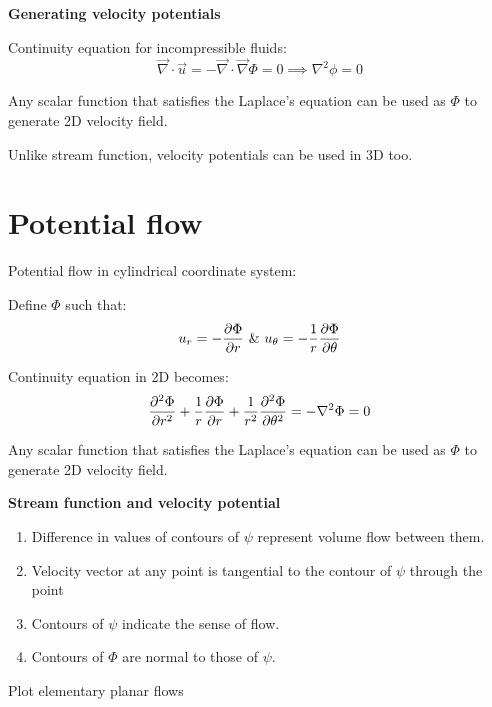 
{\bf Generating velocity potentials}

Continuity equation for incompressible fluids:
$$ \vec{\nabla} \cdot \vec{u} = - \vec{\nabla} \cdot \vec{\nabla}\Phi = 0 \implies  \nabla^2 \phi = 0 $$

Any scalar function that satisfies the Laplace's equation can be used as $\Phi$ to generate 2D velocity field.

Unlike stream function, velocity potentials can be used in 3D too.



\section{Potential flow}

Potential flow in cylindrical coordinate system:

Define $\Phi$ such that:
$$ u_r = -{\partial \Phi \over \partial r} \, \, \& \, \, u_\theta = -{1 \over r}{\partial \Phi \over \partial \theta} $$

Continuity equation in 2D becomes:
$$ {\partial^2 \Phi \over \partial r^2} + {1 \over r}{\partial \Phi \over \partial r}+ {1 \over r^2} {\partial^2 \Phi \over \partial \theta^2} = -\nabla^2 \Phi = 0 $$

Any scalar function that satisfies the Laplace's equation can be used as $\Phi$ to generate 2D velocity field.


{\bf Stream function and velocity potential}

\begin{enumerate}
\item Difference in values of contours of $\psi$ represent volume flow between them.
\item Velocity vector at any point is tangential to the contour of $\psi$ through the point
\item Contours of $\psi$ indicate the sense of flow.
\item Contours of $\Phi$ are normal to those of $\psi$.
\end{enumerate}



\begin {lo3} 
Plot elementary planar flows
\end {lo3}

